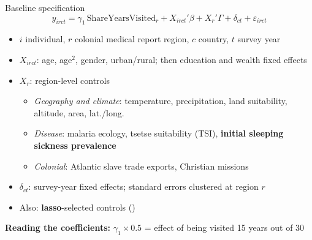 \documentclass[aspectratio=1610]{beamer}
\newcommand{\refs}[1]{{\footnotesize\color{softgray}(\citealp{#1})}} %
\begin{document}
\begin{frame}{Baseline specification}
  \[
    y_{irct} = \gamma_1\, \text{ShareYearsVisited}_r + X_{irct}'\beta + X_r'\Gamma + \delta_{ct} + \varepsilon_{irct}
  \]
  \begin{itemize}
    \item $i$ individual, $r$ colonial medical report region, $c$ country, $t$ survey year
    \item $X_{irct}$: age, age$^2$, gender, urban/rural; then education and wealth fixed effects
    \item $X_r$: region-level controls
      \begin{itemize}
        \item \emph{Geography and climate}: temperature, precipitation, land suitability, altitude, area, lat./long.
        \item \emph{Disease}: malaria ecology, tsetse suitability (TSI), \textbf{initial sleeping sickness prevalence}
        \item \emph{Colonial}: Atlantic slave trade exports, Christian missions
      \end{itemize}
    \item $\delta_{ct}$: survey-year fixed effects; standard errors clustered at region $r$
    \item Also: \textbf{lasso}-selected controls \refs{belloni_chernozhukov_hansen_2014}
  \end{itemize}
  \vspace{0.2em}
  \textbf{Reading the coefficients:} $\gamma_1 \times 0.5$ = effect of being visited 15 years out of 30
\end{frame}
\end{document}
